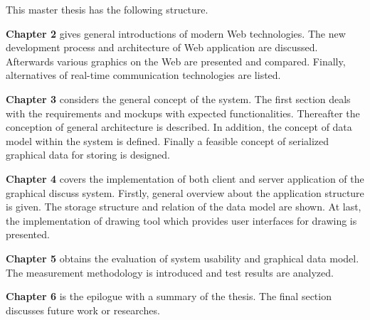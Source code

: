 This master thesis has the following structure.

\textbf{Chapter 2} gives general introductions of modern Web technologies. The new development process and architecture of Web application are discussed. Afterwards various graphics on the Web are presented and compared. Finally, alternatives of real-time communication technologies are listed.


\textbf{Chapter 3} considers the general concept of the system. The first section deals with the requirements and mockups with expected functionalities. Thereafter the conception of general architecture is described. In addition, the concept of data model within the system is defined. Finally a feasible concept of serialized graphical data for storing is designed.

\textbf{Chapter 4} covers the implementation of both client and server application of the graphical discuss system. Firstly, general overview about the application structure is given. The storage structure and relation of the data model are shown. At last, the implementation of drawing tool which provides user interfaces for drawing is presented.

\textbf{Chapter 5} obtains the evaluation of system usability and graphical data model. The measurement methodology is introduced and test results are analyzed. 

\textbf{Chapter 6} is the epilogue with a summary of the thesis. The final section discusses future work or researches.